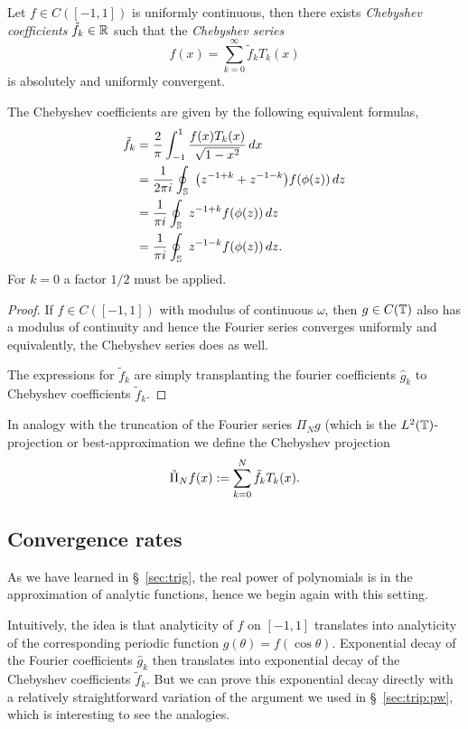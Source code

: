 \begin{lemma}
   Let $f \in C([-1,1])$ is uniformly continuous, then there exists {\em
   Chebyshev coefficients} $\tilde{f}_k \in \mathbb{R}$ such that the {\em Chebyshev
   series}
   \begin{equation} \label{eq:poly:chebseries}
      f(x) = \sum_{k = 0}^\infty \tilde{f}_k T_k(x)
   \end{equation}
   is absolutely and uniformly convergent.

   The Chebyshev coefficients are given by the following equivalent formulas,
   \begin{align*}
      \tilde{f}_k
      &=  \frac{2}{\pi} \int_{-1}^1 \frac{f(x) T_k(x)}{\sqrt{1-x^2}} \,dx \\
      &=  \frac{1}{2\pi i} \oint_{\mathbb{S}} \,\,\big(z^{-1+k} + z^{-1-k}\big) f(\phi(z))
                  \, dz \\
      &= \frac{1}{\pi i} \oint_{\mathbb{S}} \,\, z^{-1+k} f(\phi(z)) \, dz \\
      &= \frac{1}{\pi i} \oint_{\mathbb{S}} \,\, z^{-1-k} f(\phi(z)) \, dz.
   \end{align*}
   For $k = 0$ a factor $1/2$ must be applied.
\end{lemma}
\begin{proof}
   If $f \in C([-1,1])$ with modulus of continuous $\omega$, then $g \in C(\mathbb{T})$
   also has a modulus of continuity and hence the Fourier series converges
   uniformly and equivalently, the Chebyshev series does as well.

   The expressions for $\tilde{f}_k$ are simply transplanting the fourier
   coefficients $\hat{g}_k$ to Chebyshev coefficients $\tilde{f}_k$.
\end{proof}

In analogy with the truncation of the Fourier series $\Pi_N g$ (which
is the $L^2(\mathbb{T})$-projection or best-approximation we define
the Chebyshev projection
\[
   \tilde{\Pi}_N f(x) := \sum_{k = 0}^N \tilde{f}_k T_k(x).
\]


\subsection{Convergence rates}
%
\label{sec:poly:rates}
%
As we have learned in \S~\ref{sec:trig}, the real power of polynomials is in
the approximation of analytic functions, hence we begin again with this
setting.

Intuitively, the idea is that analyticity of $f$ on $[-1,1]$ translates into
analyticity of the corresponding periodic function $g(\theta) = f(\cos\theta)$.
Exponential decay of the Fourier coefficients $\hat{g}_k$ then translates into
exponential decay of the Chebyshev coefficients  $\tilde{f}_k$. But we can prove
this exponential decay directly with a relatively straightforward variation of
the argument we used in \S~\ref{sec:trip:pw}, which is interesting to see the
analogies.


